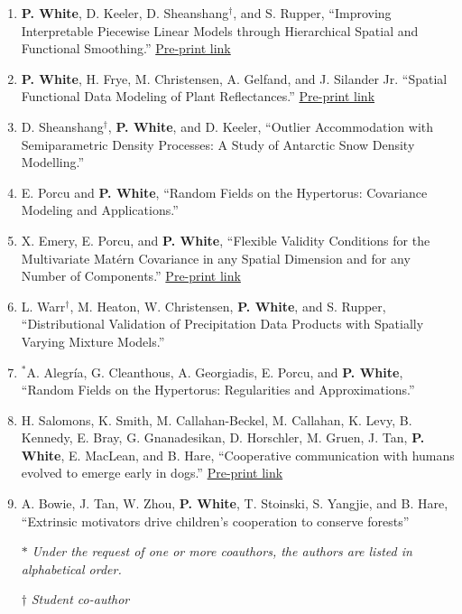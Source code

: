 \documentclass[12pt]{article}
\begin{document}
\begin{enumerate}[label=$\bullet$]
\item \textbf{P. White}, D. Keeler, D. Sheanshang$^\dagger$, and S. Rupper, ``Improving Interpretable Piecewise Linear Models through Hierarchical Spatial and Functional Smoothing.'' \href{https://arxiv.org/abs/2006.09329}{Pre-print link}
\item \textbf{P. White}, H. Frye, M. Christensen, A. Gelfand, and J. Silander Jr. ``Spatial Functional Data Modeling of Plant Reflectances.'' \href{https://arxiv.org/abs/2102.03249}{Pre-print link}
\item D. Sheanshang$^\dagger$, \textbf{P. White}, and D. Keeler, ``Outlier Accommodation with Semiparametric Density Processes: A Study of Antarctic Snow Density Modelling.''

\item  E. Porcu and \textbf{P. White}, ``Random Fields on the Hypertorus: Covariance Modeling and Applications.'' 


\item X. Emery, E. Porcu, and \textbf{P. White}, ``Flexible Validity Conditions for the Multivariate Mat\'ern Covariance in any Spatial Dimension and for any Number of Components.'' \href{https://arxiv.org/abs/2101.04235}{Pre-print link} 

\item L. Warr$^\dagger$, M. Heaton, W. Christensen, \textbf{P. White}, and S. Rupper, ``Distributional Validation of Precipitation Data Products with Spatially Varying Mixture Models.''

\item $^*$A. Alegr\'ia, G. Cleanthous, A. Georgiadis, E. Porcu, and \textbf{P. White}, ``Random Fields on the Hypertorus: Regularities and Approximations.'' 

\item H. Salomons, K. Smith, M. Callahan-Beckel, M. Callahan, K. Levy, B. Kennedy, E. Bray, G. Gnanadesikan, D. Horschler, M. Gruen, J. Tan, \textbf{P. White}, E. MacLean, and B. Hare, ``Cooperative communication with humans evolved to emerge early in dogs.'' \href{https://www.biorxiv.org/content/10.1101/2021.01.12.425620v1}{Pre-print link} 
\item A. Bowie, J. Tan, W. Zhou, \textbf{P. White}, T. Stoinski, S. Yangjie, and B. Hare, ``Extrinsic motivators drive children’s cooperation to conserve forests'' 
\setlength\itemsep{-1em} \\
\item[$*$] \textit{Under the request of one or more coauthors, the authors are listed in alphabetical order.}\\
\item[$\dagger$] \textit{Student co-author}
\end{enumerate}
\end{document}
